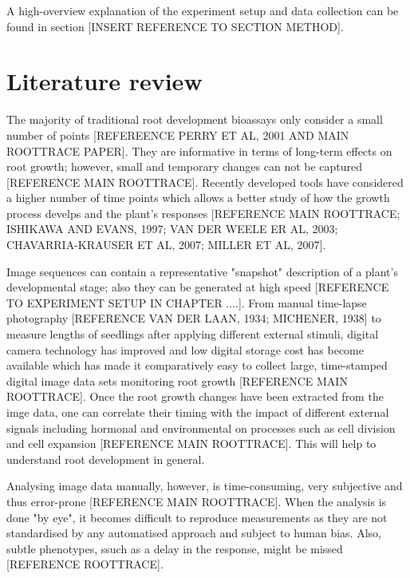 A high-overview explanation of the experiment setup and data collection can be found in section [INSERT REFERENCE TO SECTION METHOD].


\section{Literature review}

The majority of traditional root development bioassays only consider a small number of points [REFEREENCE PERRY ET AL, 2001 AND MAIN ROOTTRACE PAPER]. They are informative in terms of long-term effects on root growth; however, small and temporary changes can not be captured [REFERENCE MAIN ROOTTRACE].
Recently developed tools have considered a higher number of time points which allows a better study of how the growth process develps and the plant's responses [REFERENCE MAIN ROOTTRACE; ISHIKAWA AND EVANS, 1997; VAN DER WEELE ER AL, 2003; CHAVARRIA-KRAUSER ET AL, 2007; MILLER ET AL, 2007].  

Image sequences can contain a representative "snapshot" description of a plant's developmental stage; also they can be generated at high speed [REFERENCE TO EXPERIMENT SETUP IN CHAPTER ....]. From manual time-lapse photography [REFERENCE VAN DER LAAN, 1934; MICHENER, 1938] to measure lengths of seedlings after applying different external stimuli, digital camera  technology has improved and low digital storage cost has become available which has made it comparatively easy to collect large, time-stamped digital image data sets monitoring root growth [REFERENCE MAIN ROOTTRACE].  
Once the root growth changes have been extracted from the imge data, one can correlate their timing with the impact of different external signals including hormonal and environmental on processes such as cell division and cell expansion [REFERENCE MAIN ROOTTRACE]. This will help to understand root development in general. 

Analysing image data manually, however, is time-consuming, very subjective and thus error-prone [REFERENCE MAIN ROOTTRACE]. When the analysis is done "by eye", it becomes difficult to reproduce measurements as they are not standardised by any automatised approach and subject to human bias. Also, subtle phenotypes, ssuch as a delay in the response, might be missed [REFERENCE ROOTTRACE]. 

